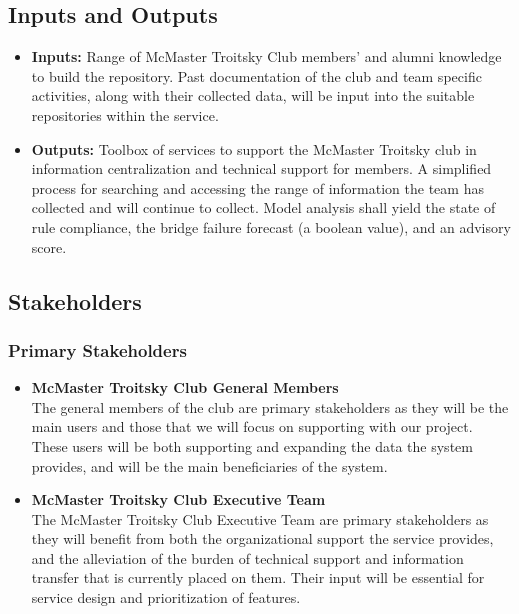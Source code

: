 \documentclass{article}
\begin{document}
\subsection{Inputs and Outputs}

\begin{itemize}
    \item \textbf{Inputs: } Range of McMaster Troitsky Club members' and alumni knowledge to build the repository. Past documentation of the club and team 
    specific activities, along with their collected data, will be input into the suitable repositories within the service.

    \item \textbf{Outputs: } Toolbox of services to support the McMaster Troitsky club in information centralization and technical 
    support for members. A simplified process for searching and accessing the range of information the team 
    has collected and will continue to collect. Model analysis shall yield the state of rule compliance, the bridge failure forecast (a boolean value), and an advisory score.
\end{itemize}

\subsection{Stakeholders}

\subsubsection{Primary Stakeholders}

\begin{itemize}
    \item \textbf{McMaster Troitsky Club General Members}
    \\
 The general members of the club are primary stakeholders as they will be the main 
users and those that we will focus on supporting with our project. These users will be both supporting and expanding the data the
system provides, and will be the main beneficiaries of the system.
    \item \textbf{McMaster Troitsky Club Executive Team}
    \\
 The McMaster Troitsky Club Executive Team are primary stakeholders as they will benefit from 
both the organizational support the service provides, and the alleviation of the burden of technical 
support and information transfer that is currently placed on them. Their input will be essential
for service design and prioritization of features.
\end{itemize}
\end{document}
